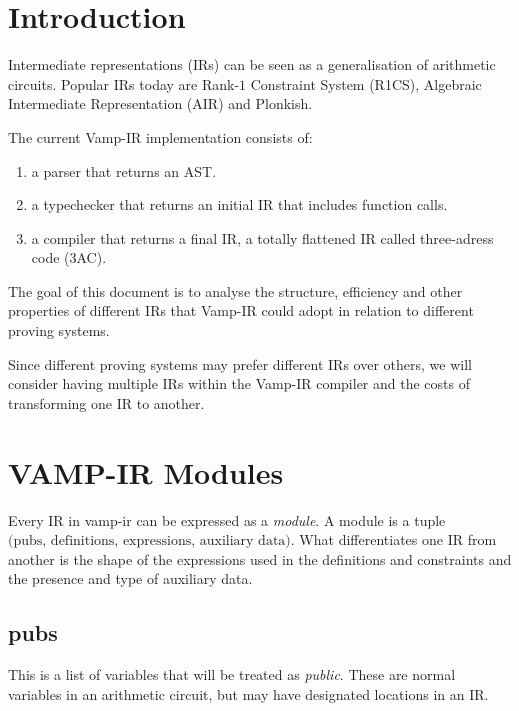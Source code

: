\documentclass[
    9pt,            %
    techreport,        %
    affiltop,       %
]{art}
\begin{document}
\maketitle
\tableofcontents

\section{Introduction}

Intermediate representations (IRs) can be seen as a generalisation of arithmetic circuits. Popular IRs today are Rank-$1$ Constraint System (R1CS), Algebraic Intermediate Representation (AIR) and Plonkish\cite{plonkish-arithmetisation}.

The current Vamp-IR implementation consists of:
\begin{enumerate}
    \item a parser that returns an AST.
    \item a typechecker that returns an initial IR that includes function calls.
    \item a compiler that returns a final IR, a totally flattened IR called three-adress code (3AC).
\end{enumerate} 

The goal of this document is to analyse the structure, efficiency and other properties of different IRs that Vamp-IR could adopt in relation to different proving systems.

Since different proving systems may prefer different IRs over others, we will consider having multiple IRs within the Vamp-IR compiler and the costs of transforming one IR to another.




\section{VAMP-IR Modules}
Every IR in vamp-ir can be expressed as a \textit{module}. A module is a tuple $\text{(pubs, definitions, expressions, auxiliary data)}$.  What differentiates one IR from another is the shape of the expressions used in the definitions and constraints and the presence and type of auxiliary data.

\subsection{pubs}
This is a list of variables that will be treated as \emph{public}. These are normal variables in an arithmetic circuit, but may have designated locations in an IR.
\end{document}
